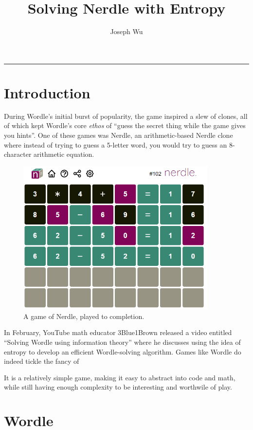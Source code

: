 \documentclass[11pt, letterpaper]{article}		%
\title{Solving Nerdle with Entropy}
\author{Joseph Wu }
\date{}
\theoremstyle{definition}
\begin{document}
\maketitle
\medskip
\hrule
\medskip

\section{Introduction}
During Wordle's initial burst of popularity, the game inspired a slew of clones, all of which kept Wordle's core \textit{ethos} of ``guess the secret thing while the game gives you hints''. One of these games was Nerdle, an arithmetic-based Nerdle clone where instead of trying to guess a 5-letter word, you would try to guess an 8-character arithmetic equation.
\begin{figure}[H]
    \centering
    \includegraphics[width=10cm]{nerdle_game.png}
    \caption{A game of Nerdle, played to completion.}
\end{figure}


In February, YouTube math educator 3Blue1Brown released a video entitled ``Solving Wordle using information theory'' where he discusses using the idea of entropy to develop an efficient Wordle-solving algorithm. Games like Wordle do indeed tickle the fancy of 

It is a relatively simple game, making it easy to abstract into code and math, while still having enough complexity to be interesting and worthwile of play.
\section{Wordle}
\end{document}
